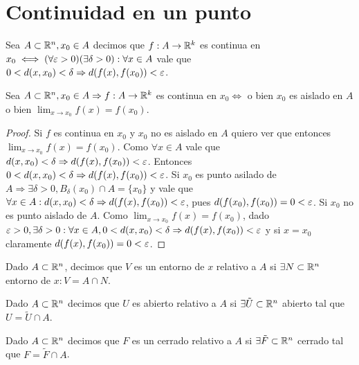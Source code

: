 \section{Continuidad en un punto}

\begin{definition}
  Sea \(A \subset \mathbb{R}^n, x_0 \in A\) decimos que \(f: A \to \mathbb{R}^k\) es continua en \(x_0 \iff (\forall \varepsilon > 0)(\exists \delta > 0) : \forall x \in A\) vale que \(0 < d(x, x_0) < \delta \Rightarrow d(f(x), f(x_0)) < \varepsilon \).
\end{definition}

\begin{lemma}
  Sea \(A \subset \mathbb{R}^n, x_0 \in A \Rightarrow f: A \to \mathbb{R}^k\) es continua en \(x_0 \iff \) o bien \(x_0\) es aislado en \(A\) o bien \(\lim_{x \to x_0} f(x) = f(x_0)\).
  \begin{proof}
    Si \(f\) es continua en \(x_0\) y \(x_0\) no es aislado en \(A\) quiero ver que entonces \(\lim_{x \to x_0} f(x) = f(x_0)\). Como \(\forall x \in A\) vale que \(d(x, x_0) < \delta \Rightarrow d(f(x), f(x_0)) < \varepsilon \). Entonces \(0 < d(x, x_0) < \delta \Rightarrow d(f(x), f(x_0)) < \varepsilon \). Si \(x_0\) es punto asilado de \(A \Rightarrow \exists \delta>0, B_{\delta}(x_0) \cap A =  \{x_0\} \) y vale que \(\forall x \in A : d(x, x_0) < \delta \Rightarrow d(f(x), f(x_0)) < \varepsilon \), pues \(d(f(x_0), f(x_0)) = 0 < \varepsilon \). Si \(x_0\) no es punto aislado de \(A\). Como \(\lim_{x \to x_0} f(x) = f(x_0)\), dado \(\varepsilon > 0, \exists \delta > 0 : \forall x \in A, 0 < d(x, x_0) < \delta \Rightarrow d(f(x), f(x_0)) < \varepsilon \) y si \(x = x_0\) claramente \(d(f(x), f(x_0)) = 0 < \varepsilon \).
  \end{proof}
\end{lemma}

\begin{definition}
  Dado \(A \subset \mathbb{R}^n\), decimos que \(V\) es un entorno de \(x\) relativo a \(A\) si \(\exists N \subset \mathbb{R}^n\) entorno de \(x : V = A \cap N\).
\end{definition}

\begin{definition}
  Dado \(A \subset \mathbb{R}^n\) decimos que \(U\) es abierto relativo a \(A\) si \(\exists \tilde{U} \subset \mathbb{R}^n\) abierto tal que \(U = \tilde{U} \cap A\).
\end{definition}

\begin{definition}
  Dado \(A \subset \mathbb{R}^n\) decimos que \(F\) es un cerrado relativo a \(A\) si \(\exists \tilde{F} \subset \mathbb{R}^n\) cerrado tal que \(F = \tilde{F} \cap A\).
\end{definition}

